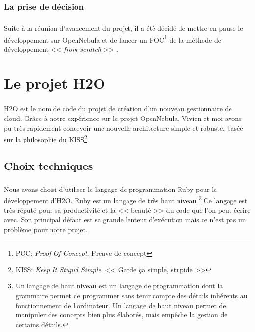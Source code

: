 \subsection{La prise de décision}
\paragraph*{}
Suite à la réunion d'avancement du projet, il a été décidé de mettre en pause le développement sur OpenNebula et de lancer un
POC\footnote{POC: \emph{Proof Of Concept}, Preuve de concept} de la méthode de développement << \emph{from scratch} >> .



\chapter{Le projet H2O}
\paragraph*{}
H2O est le nom de code du projet de création d'un nouveau gestionnaire de cloud.
Grâce à notre expérience sur le projet OpenNebula, Vivien et moi avons pu très rapidement concevoir une nouvelle architecture
simple et robuste, basée sur la philosophie du KISS\footnote{KISS: \emph{Keep It Stupid Simple}, << Garde ça simple, stupide >>}.


\section{Choix techniques}
\paragraph*{}
Nous avons choisi d'utiliser le langage de programmation Ruby pour le développement d'H2O. Ruby est un langage de très haut niveau
\footnote{Un langage de haut niveau est un langage de programmation dont la grammaire permet de programmer sans tenir compte des détails inhérents au
fonctionnement de l'ordinateur. Un langage de haut niveau permet de manipuler des concepts bien plus élaborés, mais empêche la gestion de certains détails.}
Ce langage est très réputé pour sa productivité et la << beauté >> du code que l'on peut écrire avec. Son principal défaut est sa grande lenteur d'exécution
mais ce n'est pas un problème pour notre projet.

